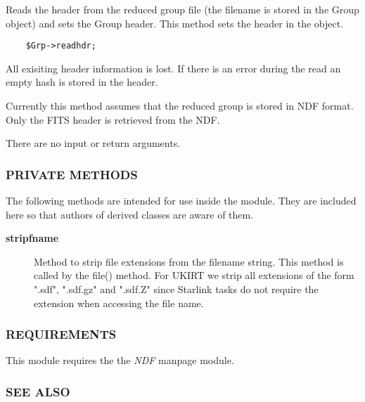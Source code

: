 \begin{description}
Reads the header from the reduced group file (the filename is stored
in the Group object) and sets the Group header. This method sets the
header in the object.

\begin{verbatim}
    $Grp->readhdr;
\end{verbatim}


All exisiting header information is lost.  If there is an error during
the read an empty hash is stored in the header.



Currently this method assumes that the reduced group is stored in
NDF format. Only the FITS header is retrieved from the NDF.



There are no input or return arguments.

\end{description}
\subsubsection*{PRIVATE METHODS\label{ORAC::Group::NDF_PRIVATE_METHODS}}

The following methods are intended for use inside the module.
They are included here so that authors of derived classes are 
aware of them.

\begin{description}
\item[\textbf{stripfname}] \mbox{}

Method to strip file extensions from the filename string. This method
is called by the file() method. For UKIRT we strip all extensions of the
form ".sdf", ".sdf.gz" and ".sdf.Z" since Starlink tasks do not require
the extension when accessing the file name.

\end{description}
\subsubsection*{REQUIREMENTS\label{ORAC::Group::NDF_REQUIREMENTS}}

This module requires the the \emph{NDF} manpage module.

\subsubsection*{SEE ALSO\label{ORAC::Group::NDF_SEE_ALSO}}

